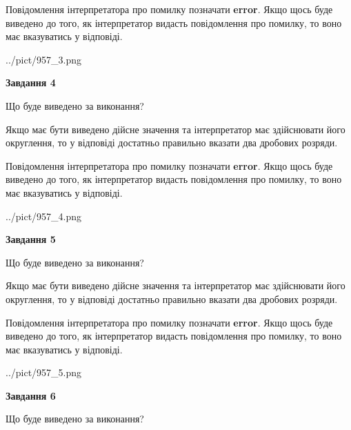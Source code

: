 \documentclass[12pt, ukrainian]{article}
\begin{document}
{\begin {Large}
Повідомлення інтерпретатора про помилку позначати \textbf{error}.
Якщо щось буде виведено до того, як інтерпретатор видасть повідомлення про помилку, 
то воно має вказуватись у відповіді. \par

\begin{center}
	{../pict/957_3.png}
\end{center}
\newpage

{\begin {center}\textbf{Завдання 4}\end {center}}\par
Що буде виведено за виконання? \par

Якщо має бути виведено дійсне значення та інтерпретатор має здійснювати його округлення, 
то у відповіді достатньо правильно вказати два дробових розряди.

Повідомлення інтерпретатора про помилку позначати \textbf{error}.
Якщо щось буде виведено до того, як інтерпретатор видасть повідомлення про помилку, 
то воно має вказуватись у відповіді. \par

\begin{center}
	{../pict/957_4.png}
\end{center}
\newpage

{\begin {center}\textbf{Завдання 5}\end {center}}\par
Що буде виведено за виконання? \par

Якщо має бути виведено дійсне значення та інтерпретатор має здійснювати його округлення, 
то у відповіді достатньо правильно вказати два дробових розряди.

Повідомлення інтерпретатора про помилку позначати \textbf{error}.
Якщо щось буде виведено до того, як інтерпретатор видасть повідомлення про помилку, 
то воно має вказуватись у відповіді. \par

\begin{center}
	{../pict/957_5.png}
\end{center}
\newpage

{\begin {center}\textbf{Завдання 6}\end {center}}\par
Що буде виведено за виконання? \par


\end{Large}}
\end{document}
